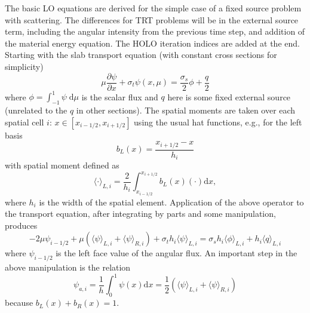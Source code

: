 \documentclass{mc2013}
\newcommand{\pderiv}[2]{\frac{\partial #1}{\partial #2}}
\renewcommand{\d}{\mathrm{d}}
\newcommand{\mom}[1]{\langle #1 \rangle}
\newcommand{\xr}{{x_{i+1/2}}}
\begin{document}
The basic LO equations are derived for the simple case of a fixed source problem with
scattering.  The differences for TRT problems will be in the external source term,
including the angular intensity from the previous time step, and addition of the material energy
equation. The HOLO iteration indices are added at the end. Starting with the slab transport equation (with constant cross sections
for simplicity)
\begin{equation}
\mu \pderiv{\psi}{x} + \sigma_t \psi(x,\mu) = \frac{\sigma_s}{2} \phi + \frac{q}{2}
\end{equation}
where $\phi=\int_{-1}^1 \psi \;\d \mu$ is the scalar flux and $q$ here is some fixed
external source (unrelated to the $q$ in other sections).  The spatial moments are
taken over each spatial cell $i$: $x\in[x_{i-1/2},x_{i+1/2}]$ using the usual hat
functions, e.g., for the left basis
\begin{equation}
b_L(x) = \frac{x_{i+1/2} - x}{h_i}
\end{equation}
with spatial moment defined as
\begin{equation}
\mom{\cdot}_{L,i} = \frac{2}{h_i} \int_{x_{i-1/2}}^{\xr} b_L(x) (\cdot) \d x,
\end{equation}
where $h_i$ is the width of the spatial element.
Application of the above operator to the transport equation, after integrating by parts and some manipulation, produces
\begin{equation}\label{left}
-2\mu \psi_{i-1/2} + \mu \left( \mom{\psi}_{L,i} + \mom\psi_{R,i} \right) + \sigma_t h_i \mom{\psi}_{L,i} = \sigma_s h_i \mom{\phi}_{L,i} + h_i \mom{q}_{L,i}
\end{equation}
where $\psi_{i-1/2}$ is the left face value of the angular flux. An important step in the above manipulation is the relation
\begin{equation}
\psi_{a,i} = \frac{1}{h}\int_0^1 \psi(x) \d x = \frac{1}{2} \left(\mom{\psi}_{L,i} + \mom{\psi}_{R,i} \right) 
\end{equation}
because $b_L(x) + b_R(x) =1 $.  
\end{document}
